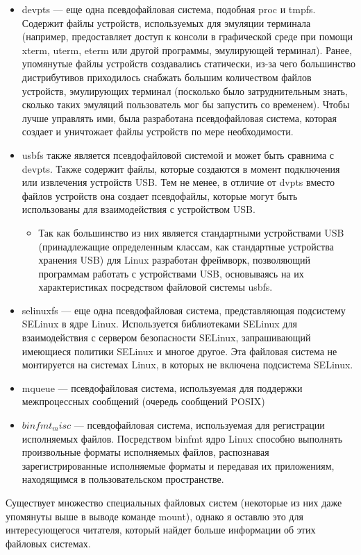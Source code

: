 \documentclass[10pt]{book}
\begin{document}
\begin{itemize}
  \item devpts — еще одна псевдофайловая система, подобная proc и tmpfs. Содержит файлы устройств, используемых для эмуляции терминала (например, предоставляет доступ к консоли в графической среде при помощи xterm, uterm, eterm или другой программы, эмулирующей терминал). Ранее, упомянутые файлы устройств создавались статически, из-за чего большинство дистрибутивов приходилось снабжать большим количеством файлов устройств, эмулирующих терминал (посколько было затруднительным знать, сколько таких эмуляций пользователь мог бы запустить со временем). Чтобы лучше управлять ими, была разработана псевдофайловая система, которая создает и уничтожает файлы устройств по мере необходимости.
  \item usbfs также является псевдофайловой системой и может быть сравнима с devpts. Также содержит файлы, которые создаются в момент подключения или извлечения устройств USB. Тем не менее, в отличие от dvpts вместо файлов устройств она создает псевдофайлы, которые могут быть использованы для взаимодействия с устройством USB.
  \begin{itemize}
    \item Так как большинство из них является стандартными устройствами USB (принадлежащие определенным классам, как стандартные устройства хранения USB) для Linux разработан фреймворк, позволяющий программам работать с устройствами USB, основываясь на их характеристиках посредством файловой системы usbfs.
  \end{itemize}
  \item selinuxfs — еще одна псевдофайловая система, представляющая подсистему SELinux в ядре Linux. Используется библиотеками SELinux для взаимодействия с сервером безопасности SELinux, запрашивающий имеющиеся политики SELinux и многое другое. Эта файловая система не монтируется на системах Linux, в которых не включена подсистема SELinux.
  \item mqueue — псевдофайловая система, используемая для поддержки межпроцессных сообщений (очередь сообщений POSIX)
  \item $binfmt_misc$ — псевдофайловая система, используемая для регистрации исполняемых файлов. Посредством binfmt ядро Linux способно выполнять произвольные форматы исполняемых файлов, распознавая зарегистрированные исполняемые форматы и передавая их приложениям, находящимся в пользовательском пространстве. 
\end{itemize}

Существует множество специальных файловых систем (некоторые из них даже упомянуты выше в выводе команде mount), однако я оставлю это для интересующегося читателя, который найдет больше информации об этих файловых системах.
\end{document}
